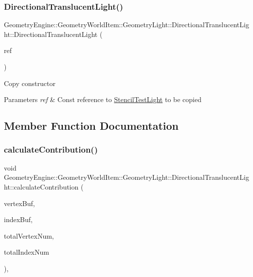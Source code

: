 \subsubsection{\texorpdfstring{DirectionalTranslucentLight()}{DirectionalTranslucentLight()}\hspace{0.1cm}{\footnotesize\ttfamily [2/2]}}
{\footnotesize\ttfamily Geometry\+Engine\+::\+Geometry\+World\+Item\+::\+Geometry\+Light\+::\+Directional\+Translucent\+Light\+::\+Directional\+Translucent\+Light (\begin{DoxyParamCaption}\item[{const \mbox{\hyperlink{class_geometry_engine_1_1_geometry_world_item_1_1_geometry_light_1_1_directional_translucent_light}{Directional\+Translucent\+Light}} \&}]{ref }\end{DoxyParamCaption})\hspace{0.3cm}{\ttfamily [inline]}}

Copy constructor 
\begin{DoxyParams}{Parameters}
{\em ref} & Const reference to \mbox{\hyperlink{class_geometry_engine_1_1_geometry_world_item_1_1_geometry_light_1_1_stencil_test_light}{Stencil\+Test\+Light}} to be copied \\
\hline
\end{DoxyParams}


\subsection{Member Function Documentation}
\mbox{\label{class_geometry_engine_1_1_geometry_world_item_1_1_geometry_light_1_1_directional_translucent_light_a3e178fedac23b432dbcdc03115abec09}} 
\subsubsection{\texorpdfstring{calculateContribution()}{calculateContribution()}}
{\footnotesize\ttfamily void Geometry\+Engine\+::\+Geometry\+World\+Item\+::\+Geometry\+Light\+::\+Directional\+Translucent\+Light\+::calculate\+Contribution (\begin{DoxyParamCaption}\item[{Q\+Open\+G\+L\+Buffer $\ast$}]{vertex\+Buf,  }\item[{Q\+Open\+G\+L\+Buffer $\ast$}]{index\+Buf,  }\item[{unsigned int}]{total\+Vertex\+Num,  }\item[{unsigned int}]{total\+Index\+Num }\end{DoxyParamCaption})\hspace{0.3cm}{\ttfamily [protected]}, {\ttfamily [virtual]}}

